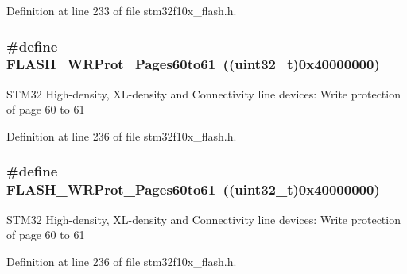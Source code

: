 Definition at line 233 of file stm32f10x\+\_\+flash.\+h.

\subsubsection[{\texorpdfstring{F\+L\+A\+S\+H\+\_\+\+W\+R\+Prot\+\_\+\+Pages60to61}{FLASH_WRProt_Pages60to61}}]{\setlength{\rightskip}{0pt plus 5cm}\#define F\+L\+A\+S\+H\+\_\+\+W\+R\+Prot\+\_\+\+Pages60to61~(({\bf uint32\+\_\+t})0x40000000)}\hypertarget{group___option___bytes___write___protection_ga22f620be7f346efcb2cbb732b879fd0c}{}\label{group___option___bytes___write___protection_ga22f620be7f346efcb2cbb732b879fd0c}
S\+T\+M32 High-\/density, X\+L-\/density and Connectivity line devices\+: Write protection of page 60 to 61 

Definition at line 236 of file stm32f10x\+\_\+flash.\+h.

\subsubsection[{\texorpdfstring{F\+L\+A\+S\+H\+\_\+\+W\+R\+Prot\+\_\+\+Pages60to61}{FLASH_WRProt_Pages60to61}}]{\setlength{\rightskip}{0pt plus 5cm}\#define F\+L\+A\+S\+H\+\_\+\+W\+R\+Prot\+\_\+\+Pages60to61~(({\bf uint32\+\_\+t})0x40000000)}\hypertarget{group___option___bytes___write___protection_ga22f620be7f346efcb2cbb732b879fd0c}{}\label{group___option___bytes___write___protection_ga22f620be7f346efcb2cbb732b879fd0c}
S\+T\+M32 High-\/density, X\+L-\/density and Connectivity line devices\+: Write protection of page 60 to 61 

Definition at line 236 of file stm32f10x\+\_\+flash.\+h.

